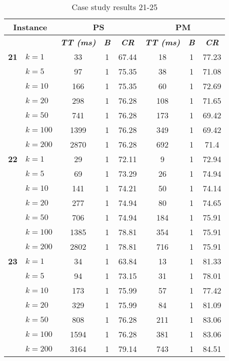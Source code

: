     \begin{table}[htbp]
    \caption{Case study results 21-25}
    \centering
    \begin{tabular}{|l|l|c|c|c|c|c|c|}
    \hline
    \multicolumn{ 2}{|c|}{\textbf{Instance}} & \multicolumn{ 3}{c|}{\textbf{PS}} & \multicolumn{ 3}{c|}{\textbf{PM}} \\ \hline
    \multicolumn{ 2}{|l|}{} & \textbf{\textit{TT (ms)}} & \textbf{\textit{B}} & \textbf{\textit{CR}} & \textbf{\textit{TT (ms)}} & \textbf{\textit{B}} & \textbf{\textit{CR}} \\ \hline
    \multicolumn{1}{|r|}{\textbf{21}} & $k=1$ & 33 & 1 & 67.44 & 18 & 1 & 77.23 \\ 
     & $k=5$ & 97 & 1 & 75.35 & 38 & 1 & 71.08 \\ 
     & $k=10$ & 166 & 1 & 75.35 & 60 & 1 & 72.69 \\ 
     & $k=20$ & 298 & 1 & 76.28 & 108 & 1 & 71.65 \\ 
     & $k=50$ & 741 & 1 & 76.28 & 173 & 1 & 69.42 \\ 
     & $k=100$ & 1399 & 1 & 76.28 & 349 & 1 & 69.42 \\ 
     & $k=200$ & 2870 & 1 & 76.28 & 692 & 1 & 71.4 \\ \hline
    \multicolumn{1}{|r|}{\textbf{22}} & $k=1$ & 29 & 1 & 72.11 & 9 & 1 & 72.94 \\ 
     & $k=5$ & 69 & 1 & 73.29 & 26 & 1 & 74.94 \\ 
     & $k=10$ & 141 & 1 & 74.21 & 50 & 1 & 74.14 \\ 
     & $k=20$ & 277 & 1 & 74.94 & 80 & 1 & 74.65 \\ 
     & $k=50$ & 706 & 1 & 74.94 & 184 & 1 & 75.91 \\ 
     & $k=100$ & 1385 & 1 & 78.81 & 354 & 1 & 75.91 \\ 
     & $k=200$ & 2802 & 1 & 78.81 & 716 & 1 & 75.91 \\ \hline
    \multicolumn{1}{|r|}{\textbf{23}} & $k=1$ & 34 & 1 & 63.84 & 13 & 1 & 81.33 \\ 
     & $k=5$ & 94 & 1 & 73.15 & 31 & 1 & 78.01 \\ 
     & $k=10$ & 173 & 1 & 75.99 & 57 & 1 & 77.42 \\ 
     & $k=20$ & 329 & 1 & 75.99 & 84 & 1 & 81.09 \\ 
     & $k=50$ & 808 & 1 & 76.28 & 211 & 1 & 83.06 \\ 
     & $k=100$ & 1594 & 1 & 76.28 & 381 & 1 & 83.06 \\ 
     & $k=200$ & 3164 & 1 & 79.14 & 743 & 1 & 84.51 \\ \hline

\end{tabular}
\end{table}
